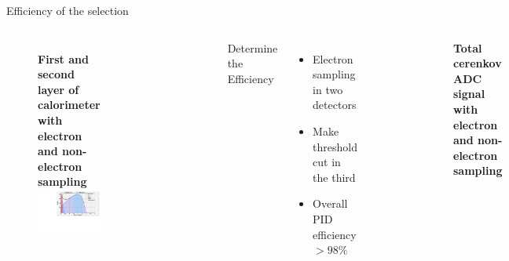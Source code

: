 \documentclass{beamer}
\begin{document}
\begin{frame}{Efficiency of the selection}
	\begin{block}{}
		\begin{columns}
			\vspace{-18pt}
			\begin{figure}
				\textbf{First and second layer of calorimeter with electron and non-electron sampling}
				\includegraphics[width=4.50cm]{../images/Lprl1.pdf}
			\end{figure}
			\vspace{-23pt}
			\begin{figure}
				\includegraphics[width=4.50cm]{../images/Lprl2.pdf}
			\end{figure}
			Determine the Efficiency
			
			\begin{itemize}
				\item Electron sampling in two detectors
				\item Make threshold cut in the third
				\item Overall PID efficiency $> 98\% $
			\end{itemize}
			\vspace{-16pt}
			\begin{figure}
				\includegraphics[width=5.50cm]{../images/Lcerasum.pdf}
			\end{figure}
			\vspace{-16pt}
			\textbf{Total cerenkov ADC signal with electron and non-electron sampling}
		\end{columns}
	\end{block}
\end{frame}
\end{document}

